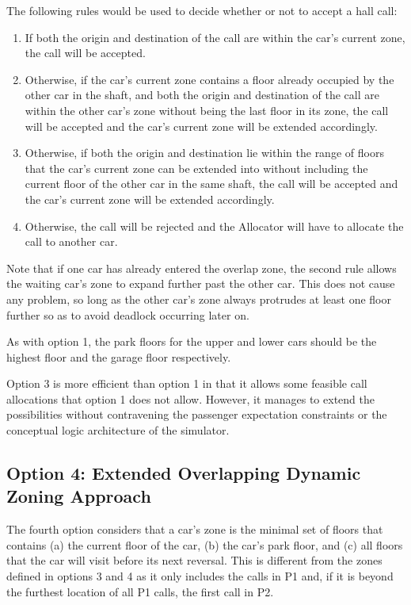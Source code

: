 \documentclass{UoYCSproject}
\begin{document}
The following rules would be used to decide whether or not to accept a hall call:
\begin{enumerate}
	\item If both the origin and destination of the call are within the car's current zone, the call will be accepted.
	\item Otherwise, if the car's current zone contains a floor already occupied by the other car in the shaft, and both the origin and destination of the call are within the other car's zone without being the last floor in its zone, the call will be accepted and the car's current zone will be extended accordingly.
	\item Otherwise, if both the origin and destination lie within the range of floors that the car's current zone can be extended into without including the current floor of the other car in the same shaft, the call will be accepted and the car's current zone will be extended accordingly.
	\item Otherwise, the call will be rejected and the Allocator will have to allocate the call to another car.
\end{enumerate}

Note that if one car has already entered the overlap zone, the second rule allows the waiting car's zone to expand further past the other car.  This does not cause any problem, so long as the other car's zone always protrudes at least one floor further so as to avoid deadlock occurring later on.

As with option 1, the park floors for the upper and lower cars should be the highest floor and the garage floor respectively.

Option 3 is more efficient than option 1 in that it allows some feasible call allocations that option 1 does not allow.  However, it manages to extend the possibilities without contravening the passenger expectation constraints or the conceptual logic architecture of the simulator.

\subsection{Option 4: Extended Overlapping Dynamic Zoning Approach}

The fourth option considers that a car's zone is the minimal set of floors that contains (a) the current floor of the car, (b) the car's park floor, and (c) all floors that the car will visit before its next reversal.  This is different from the zones defined in options 3 and 4 as it only includes the calls in P1 and, if it is beyond the furthest location of all P1 calls, the first call in P2.
\end{document}
